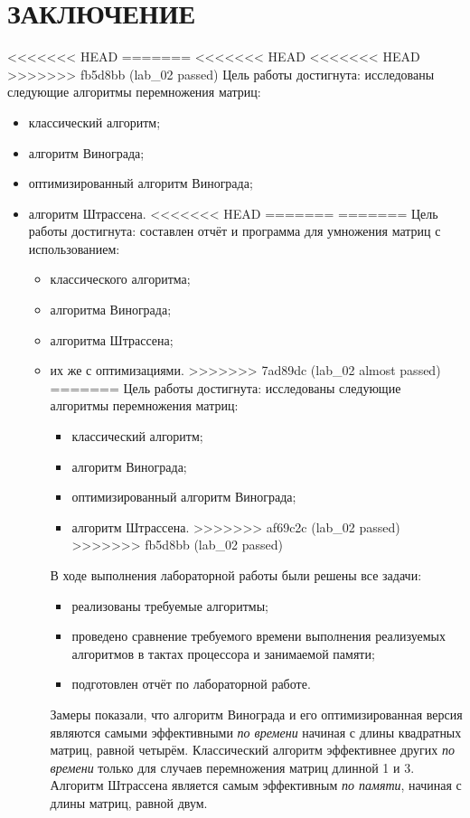 \section*{ЗАКЛЮЧЕНИЕ}

<<<<<<< HEAD
=======
<<<<<<< HEAD
<<<<<<< HEAD
>>>>>>> fb5d8bb (lab_02 passed)
Цель работы достигнута: исследованы следующие алгоритмы перемножения матриц:
\begin{itemize}
	\item классический алгоритм;
	\item алгоритм Винограда;
	\item оптимизированный алгоритм Винограда;
	\item алгоритм Штрассена.
<<<<<<< HEAD
=======
=======
Цель работы достигнута: составлен отчёт и программа для умножения матриц с использованием:
\begin{itemize}
	\item классического алгоритма;
	\item алгоритма Винограда;
	\item алгоритма Штрассена;
	\item их же с оптимизациями.
>>>>>>> 7ad89dc (lab_02 almost passed)
=======
Цель работы достигнута: исследованы следующие алгоритмы перемножения матриц:
\begin{itemize}
	\item классический алгоритм;
	\item алгоритм Винограда;
	\item оптимизированный алгоритм Винограда;
	\item алгоритм Штрассена.
>>>>>>> af69c2c (lab_02 passed)
>>>>>>> fb5d8bb (lab_02 passed)
\end{itemize}

В ходе выполнения лабораторной работы были решены все задачи:
\begin{itemize}
	\item реализованы требуемые алгоритмы;
	\item проведено сравнение требуемого времени выполнения реализуемых алгоритмов в тактах процессора и занимаемой памяти;
	\item подготовлен отчёт по лабораторной работе.
\end{itemize}

Замеры показали, что алгоритм Винограда и его оптимизированная версия являются самыми эффективными \textit{по времени} начиная с длины квадратных матриц, равной четырём.
Классический алгоритм эффективнее других \textit{по времени} только для случаев перемножения матриц длинной 1 и 3.
Алгоритм Штрассена является самым эффективным \textit{по памяти}, начиная с длины матриц, равной двум.


\end{itemize}
\end{itemize}
